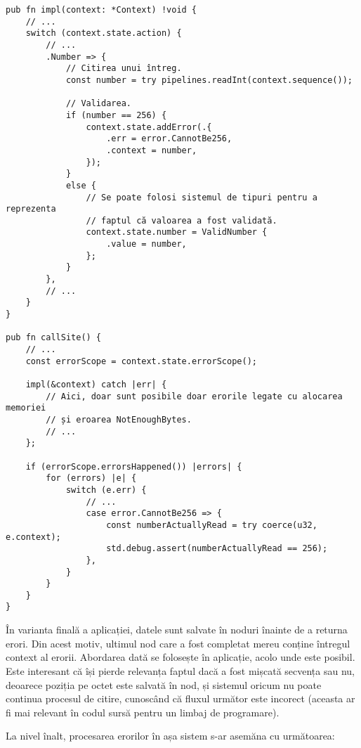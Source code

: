 \documentclass[a4paper,12pt]{report}
\begin{document}
\begin{verbatim}
pub fn impl(context: *Context) !void {
    // ...
    switch (context.state.action) {
        // ...
        .Number => {
            // Citirea unui întreg.
            const number = try pipelines.readInt(context.sequence());

            // Validarea.
            if (number == 256) {
                context.state.addError(.{
                    .err = error.CannotBe256,
                    .context = number,
                });
            }
            else {
                // Se poate folosi sistemul de tipuri pentru a reprezenta
                // faptul că valoarea a fost validată.
                context.state.number = ValidNumber {
                    .value = number,
                };
            }
        },
        // ...
    }
}

pub fn callSite() {
    // ... 
    const errorScope = context.state.errorScope();

    impl(&context) catch |err| {
        // Aici, doar sunt posibile doar erorile legate cu alocarea memoriei
        // și eroarea NotEnoughBytes.
        // ...
    };

    if (errorScope.errorsHappened()) |errors| {
        for (errors) |e| {
            switch (e.err) {
                // ...
                case error.CannotBe256 => {
                    const numberActuallyRead = try coerce(u32, e.context);
                    std.debug.assert(numberActuallyRead == 256);
                },
            }
        }
    }
}
\end{verbatim}

În varianta finală a aplicației, datele sunt salvate în noduri înainte de a returna erori.
Din acest motiv, ultimul nod care a fost completat mereu conține întregul context al erorii.
Abordarea dată se folosește în aplicație, acolo unde este posibil.
Este interesant că își pierde relevanța faptul dacă a fost mișcată secvența sau nu,
deoarece poziția pe octet este salvată în nod, și sistemul oricum nu poate continua procesul de citire,
cunoscând că fluxul următor este incorect
(aceasta ar fi mai relevant în codul sursă pentru un limbaj de programare).

La nivel înalt, procesarea erorilor în așa sistem s-ar asemăna cu următoarea:
\end{document}
